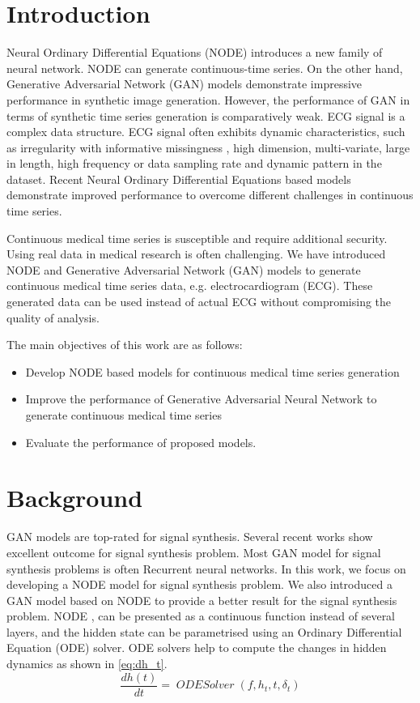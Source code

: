 \documentclass{article}
\DeclareMathOperator{\ODESOLVER}{\textit{ODESolver}}
\begin{document}
\section{Introduction}
Neural Ordinary Differential Equations (NODE) \cite{chen2018neural} introduces a new family of neural network. NODE can generate continuous-time series. On the other hand, Generative Adversarial Network (GAN) models demonstrate impressive performance in synthetic image generation. However, the performance of GAN in terms of synthetic time series generation \citep{ledig2017photo,hartmann2018eeg, li2019mad} is comparatively weak. ECG signal is a complex data structure. ECG signal often exhibits dynamic characteristics, such as irregularity with informative missingness \cite{grud}, high dimension, multi-variate, large in length, high frequency or data sampling rate and dynamic pattern in the dataset. Recent Neural Ordinary Differential Equations based models \citep{chen2018neural, habiba2020neuralode, kidger2020neural,grathwohl2018ffjord, rubanova2019latent} demonstrate improved performance to overcome different challenges in continuous time series. 

Continuous medical time series is susceptible and require additional security. Using real data in medical research is often challenging. We have introduced  NODE and Generative Adversarial Network (GAN) models to generate continuous medical time series data, e.g. electrocardiogram (ECG). These generated data can be used instead of actual ECG without compromising the quality of analysis. 
   

The main objectives of this work are as follows:

\begin{itemize}
	\item Develop NODE based models for continuous medical time series generation
	\item Improve the performance of Generative  Adversarial Neural Network to generate continuous medical time series
	\item Evaluate the performance of proposed models.
\end{itemize}


\section{Background}
GAN models are top-rated for signal synthesis. Several recent works show excellent outcome for signal synthesis problem. Most GAN model for signal synthesis problems is often Recurrent neural networks. In this work, we focus on developing a NODE model for signal synthesis problem. We also introduced a GAN model based on NODE to provide a better result for the signal synthesis problem.  
NODE \cite{che2018recurrent, habiba2020neural},  can be presented as a continuous function instead of several layers, and the hidden state can be parametrised using an Ordinary Differential Equation (ODE) solver.  ODE solvers help to compute the changes in hidden dynamics as shown in \ref{eq:dh_t}. 
\begin{equation}
	\label{eq:dh_t}
	\frac{dh(t)}{dt} =\ODESOLVER(f, h_{t},t, \delta_{t})
\end{equation} 
\end{document}
